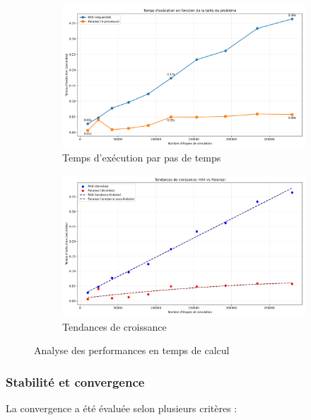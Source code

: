 \begin{figure}[h]
    \centering
    \begin{subfigure}[b]{0.48\textwidth}
        \includegraphics[width=\textwidth]{figures/benchmarks/execution_time_steps}
        \caption{Temps d'exécution par pas de temps}
        \label{fig:exec_time}
    \end{subfigure}
    \begin{subfigure}[b]{0.48\textwidth}
        \includegraphics[width=\textwidth]{figures/benchmarks/growth_trends}
        \caption{Tendances de croissance}
        \label{fig:growth_trends}
    \end{subfigure}
    \caption{Analyse des performances en temps de calcul}
    \label{fig:performance_analysis}
\end{figure}

\subsubsection{Stabilité et convergence}
La convergence a été évaluée selon plusieurs critères :

